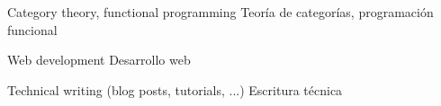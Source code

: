 
\cvitem
{}
{\enes
  {Category theory, functional programming}
  {Teoría de categorías, programación funcional}
}

\cvitem
{}
{\enes
  {Web development}
  {Desarrollo web}
}

\cvitem
{}
{\enes
  {Technical writing (blog posts, tutorials, ...)}
  {Escritura técnica}
}
